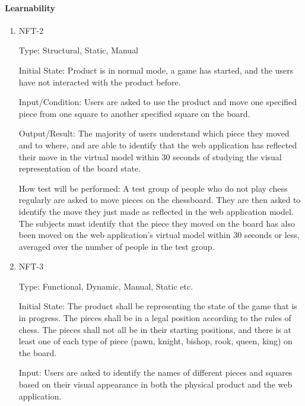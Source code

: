 \documentclass[12pt, titlepage]{article}
\begin{document}
\paragraph{Learnability}
\begin{enumerate}
    \item{NFT-2}

        Type: Structural, Static, Manual
                            
        Initial State: Product is in normal mode, a game has started, and the users have not interacted with the product before. 
                            
        Input/Condition: Users are asked to use the product and move one specified piece from one square to another specified square on the board.
                            
        Output/Result: The majority of users understand which piece they moved and to where, and are able to identify that the web application 
            has reflected their move in the virtual model within 30 seconds of studying the visual representation of the board state.
                            
        How test will be performed: A test group of people who do not play chess regularly are asked to move pieces on the chessboard. They are 
            then asked to identify the move they just made as reflected in the web application model. The subjects must identify that the piece they
            moved on the board has also been moved on the web application's virtual model within 30 seconds or less, averaged over the number of people
            in the test group.
                        
    \item{NFT-3}

        Type: Functional, Dynamic, Manual, Static etc.
                            
        Initial State: The product shall be representing the state of the game that is in progress. The pieces shall be in a legal position according to 
            the rules of chess. The pieces shall not all be in their starting positions, and there is at least one of each type of piece 
            (pawn, knight, bishop, rook, queen, king) on the board.
                            
        Input: Users are asked to identify the names of different pieces and squares based on their visual appearance in both the 
            physical product and the web application.
                            

\end{enumerate}
\end{document}
